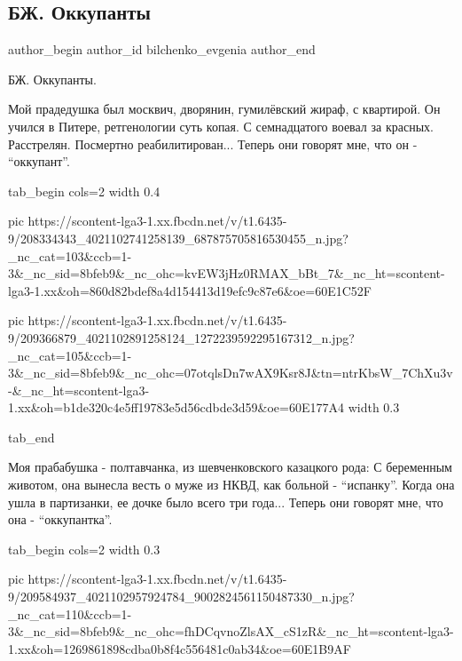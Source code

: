  
 
 
 
 
 
\subsection{БЖ. Оккупанты}
\label{sec:30_06_2021.fb.bilchenko_evgenia.2.okkupanty}
\ifcmt
 author_begin
   author_id bilchenko_evgenia
 author_end
\fi

БЖ. Оккупанты.

\obeycr
\noindent Мой прадедушка был москвич, дворянин, гумилёвский жираф, с квартирой.
Он учился в Питере, ретгенологии суть копая.
С семнадцатого воевал за красных. Расстрелян. Посмертно реабилитирован...
Теперь они говорят мне, что он - \enquote{оккупант}. 
\restorecr

\ifcmt
  tab_begin cols=2
  width 0.4

     pic https://scontent-lga3-1.xx.fbcdn.net/v/t1.6435-9/208334343_4021102741258139_687875705816530455_n.jpg?_nc_cat=103&ccb=1-3&_nc_sid=8bfeb9&_nc_ohc=kvEW3jHz0RMAX_bBt_7&_nc_ht=scontent-lga3-1.xx&oh=860d82bdef8a4d154413d19efc9c87e6&oe=60E1C52F

     pic https://scontent-lga3-1.xx.fbcdn.net/v/t1.6435-9/209366879_4021102891258124_1272239592295167312_n.jpg?_nc_cat=105&ccb=1-3&_nc_sid=8bfeb9&_nc_ohc=07otqlsDn7wAX9Ksr8J&tn=ntrKbsW_7ChXu3v-&_nc_ht=scontent-lga3-1.xx&oh=b1de320c4e5ff19783e5d56cdbde3d59&oe=60E177A4
  width 0.3

  tab_end
\fi

\obeycr
\noindent Моя прабабушка - полтавчанка, из шевченковского казацкого рода:
С беременным животом, она вынесла весть о муже из НКВД, как больной - \enquote{испанку}.
Когда она ушла в партизанки, ее дочке было всего три года...
Теперь они говорят мне, что она - \enquote{оккупантка}.
\restorecr

\ifcmt
  tab_begin cols=2
     width 0.3

     pic https://scontent-lga3-1.xx.fbcdn.net/v/t1.6435-9/209584937_4021102957924784_9002824561150487330_n.jpg?_nc_cat=110&ccb=1-3&_nc_sid=8bfeb9&_nc_ohc=fhDCqvnoZlsAX_cS1zR&_nc_ht=scontent-lga3-1.xx&oh=1269861898cdba0b8f4c556481c0ab34&oe=60E1B9AF

